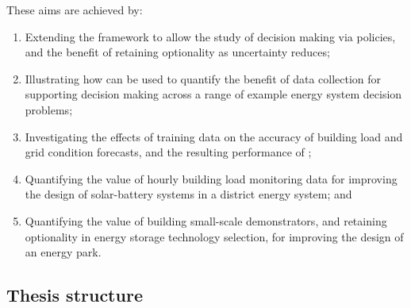 \noindent These aims are achieved by:
\begin{enumerate}[label=\it\arabic*\hspace{.5ex}]
    \item Extending the  framework to allow the study of decision making via policies, and the benefit of retaining optionality as uncertainty reduces;
    \item Illustrating how  can be used to quantify the benefit of data collection for supporting decision making across a range of example energy system decision problems;
    \item Investigating the effects of training data on the accuracy of building load and grid condition forecasts, and the resulting performance of ;
    \item Quantifying the value of hourly building load monitoring data for improving the design of solar-battery systems in a district energy system; and
    \item Quantifying the value of building small-scale demonstrators, and retaining optionality in energy storage technology selection, for improving the design of an energy park.
\end{enumerate}


\newpage
\subsection{Thesis structure}

